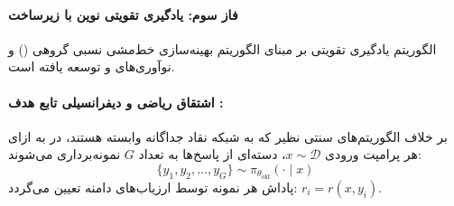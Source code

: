 \begin{table}[htbp]
\centering
\caption{پارامترهای بهینه‌سازی فاز  در خانواده }
\label{tab:olmo3_dpo_hyperparameters}
\end{table}

\paragraph*{فاز سوم: یادگیری تقویتی نوین با زیرساخت }
الگوریتم یادگیری تقویتی  بر مبنای الگوریتم بهینه‌سازی خط‌مشی نسبی گروهی () \cite{shao2024deepseekmath} و نوآوری‌های  \cite{yu2025dapo} و \cite{liu2025understanding} توسعه یافته است.

\paragraph*{اشتقاق ریاضی و دیفرانسیلی تابع هدف :}
بر خلاف الگوریتم‌های سنتی نظیر  که به شبکه نقاد جداگانه وابسته هستند، در  به ازای هر پرامپت ورودی $x \sim \mathcal{D}$، دسته‌ای از پاسخ‌ها به تعداد $G$ نمونه‌برداری می‌شوند:
\begin{equation}
    \{y_1, y_2, \dots, y_G\} \sim \pi_{\theta_{\text{old}}}(\cdot \mid x)
\end{equation}
پاداش هر نمونه توسط ارزیاب‌های دامنه تعیین می‌گردد: $r_i = r(x, y_i)$.

